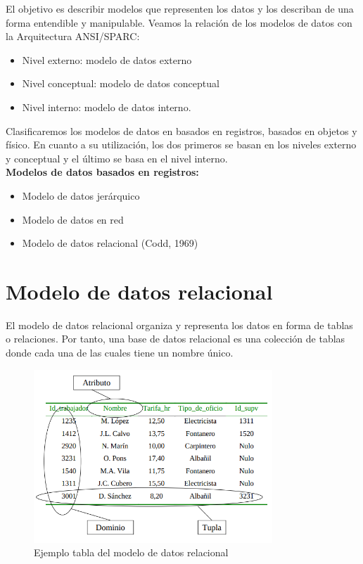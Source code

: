 \documentclass[a4paper,11pt]{article}
\begin{document}
El objetivo es describir modelos que representen los datos y los describan de una forma entendible y manipulable. Veamos la relación de los modelos de datos con la Arquitectura ANSI/SPARC:

\begin{itemize}
\item Nivel externo: modelo de datos externo
\item Nivel conceptual: modelo de datos conceptual
\item Nivel interno: modelo de datos interno.
\end{itemize}

Clasificaremos los modelos de datos en basados en registros, basados en objetos y físico. En cuanto a su utilización, los dos primeros se basan en los niveles externo y conceptual y el último se basa en el nivel interno. \\

\textbf{Modelos de datos basados en registros:}
\begin{itemize}
\item Modelo de datos jerárquico
\item Modelo de datos en red
\item Modelo de datos relacional (Codd, 1969)
\end{itemize}

\section{Modelo de datos relacional}
El modelo de datos relacional organiza y representa los datos en forma de tablas o relaciones. Por tanto, una base de datos relacional es una colección de tablas donde cada una de las cuales tiene un nombre único.

\begin{figure}[h]
\centering
\includegraphics[scale=1,width=0.8\textwidth]{ejemplo_tabla.png}
\caption{Ejemplo tabla del modelo de datos relacional}
\end{figure}
\end{document}
